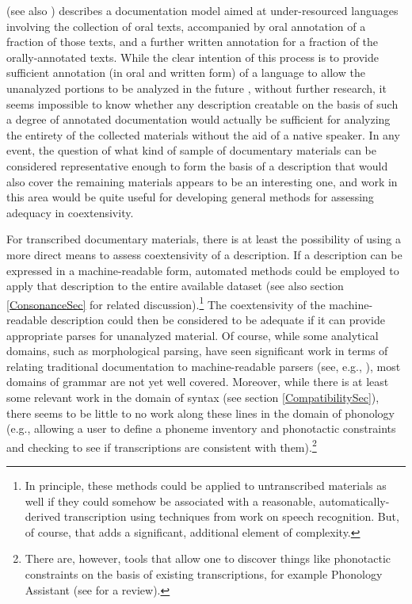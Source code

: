 \documentclass[12pt]{article}
\newcommand{\sref}[1]{section \ref{#1}}
\newcommand\namecite{\citet}
\renewcommand\cite{\citep}
\begin{document}
\namecite{Bird:2010} (see also \namecite{Reiman:2010}) describes a documentation
model aimed at under-resourced languages involving the collection of oral texts,
accompanied by oral annotation of a fraction of those texts, and a further
written annotation for a fraction of the orally-annotated texts. While the clear
intention of this process is to provide sufficient annotation (in oral and
written form) of a language to allow the unanalyzed portions to be analyzed in
the future \cite[7]{Bird:2010}, without further research, it seems impossible to
know whether any description creatable on the basis of such a degree of
annotated documentation would actually be sufficient for analyzing the entirety
of the collected materials without the aid of a native speaker. In any event,
the question of what kind of sample of documentary materials can be considered
representative enough to form the basis of a description that would also cover
the remaining materials appears to be an interesting one, and work in this area
would be quite useful for developing general methods for assessing adequacy in
coextensivity.

For transcribed documentary materials, there is at least the possibility of
using a more direct means to assess coextensivity of a description. If a
description can be expressed in a machine-readable form, automated methods could
be employed to apply that description to the entire available dataset (see also
\sref{ConsonanceSec} for related discussion).{\footnote{In principle, these
methods could be applied to untranscribed materials as well if they could
somehow be associated with a reasonable, automatically-derived transcription
using techniques from work on speech recognition. But, of course, that adds a
significant, additional element of complexity.}} The coextensivity of the
machine-readable description could then be considered to be adequate if it can
provide appropriate parses for unanalyzed material. Of course, while some
analytical domains, such as morphological parsing, have seen significant work in
terms of relating traditional documentation to machine-readable parsers (see,
e.g., \namecite{BlackSimons:2008}), most domains of grammar are not yet well
covered. Moreover, while there is at least some relevant work in the domain of
syntax (see \sref{CompatibilitySec}), there seems to be little to no work along
these lines in the domain of phonology (e.g., allowing a user to define a
phoneme inventory and phonotactic constraints and checking to see if
transcriptions are consistent with them).{\footnote{There are, however, tools
that allow one to discover things like phonotactic constraints on the basis of
existing transcriptions, for example Phonology Assistant (see
\namecite{Dingemanse:2008} for a review).}}
\end{document}
